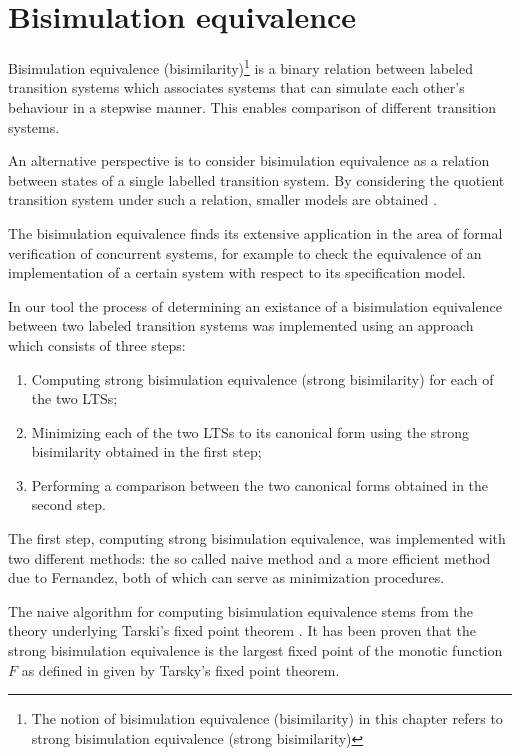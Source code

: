 \section{Bisimulation equivalence}
Bisimulation equivalence (bisimilarity)\footnote{The notion of bisimulation equivalence (bisimilarity) in this chapter 
refers to strong bisimulation equivalence (strong bisimilarity)} is a binary relation between labeled transition systems 
which associates systems that can simulate each other's behaviour in a stepwise manner. This enables comparison of 
different transition systems.

An alternative perspective is to consider bisimulation equivalence as a relation between states of a single labelled 
transition system. By considering the quotient transition system under such a relation, smaller models are obtained
\cite{ModelChecking}.

The bisimulation equivalence finds its extensive application in the area of formal verification of concurrent systems,
for example to check the equivalence of an implementation of a certain system with respect to its specification model.

In our tool the process of determining an existance of a bisimulation equivalence 
between two labeled transition systems was implemented using an approach which consists of three steps:

\begin{enumerate}
\item Computing strong bisimulation equivalence (strong bisimilarity) for each of the two LTSs;
\item Minimizing each of the two LTSs to its canonical form using the strong bisimilarity obtained
in the first step;
\item Performing a comparison between the two canonical forms obtained in the second step.
\end{enumerate}

The first step, computing strong bisimulation equivalence, was implemented with two different methods: the so called
naive method and a more efficient method due to Fernandez, both of which can serve as minimization procedures.

The naive algorithm \cite{ReactiveSystems1} for computing bisimulation equivalence stems from the theory underlying 
Tarski's fixed point theorem \cite{ReactiveSystems2}. It has been proven that the strong bisimulation equivalence is 
the largest fixed point of the monotic function $F$ as defined in \cite{ReactiveSystems1} given by Tarsky's fixed point theorem. 

